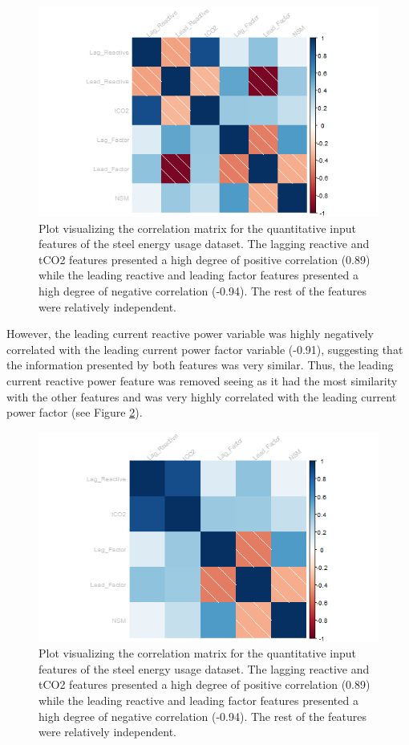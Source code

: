 \documentclass[10pt]{article}\usepackage[]{graphicx}\usepackage[]{xcolor}
\begin{document}
\begin{figure}[htp]
  \centering
  \includegraphics[scale=0.8]{EDA/corrplot_steel.png}
  \caption{Plot visualizing the correlation matrix for the quantitative input features of the steel energy usage dataset. The lagging reactive and tCO2 features presented a high degree of positive correlation (0.89) while the leading reactive and leading factor features presented a high degree of negative correlation (-0.94). The rest of the features were relatively independent.}
  \label{img:steel_corrplot}
\end{figure}

However, the leading current reactive power variable was highly negatively correlated with the leading current power factor variable (-0.91), suggesting that the information presented by both features was very similar. Thus, the leading current reactive power feature was removed seeing as it had the most similarity with the other features and was very highly correlated with the leading current power factor (see Figure \ref{img:steel_corrplot_trimmed}). \\

\begin{figure}[htp]
  \centering
  \includegraphics[scale=0.8]{EDA/corrplot_steel_trimmed.png}
  \caption{Plot visualizing the correlation matrix for the quantitative input features of the steel energy usage dataset. The lagging reactive and tCO2 features presented a high degree of positive correlation (0.89) while the leading reactive and leading factor features presented a high degree of negative correlation (-0.94). The rest of the features were relatively independent.}
  \label{img:steel_corrplot_trimmed}
\end{figure}
\end{document}
